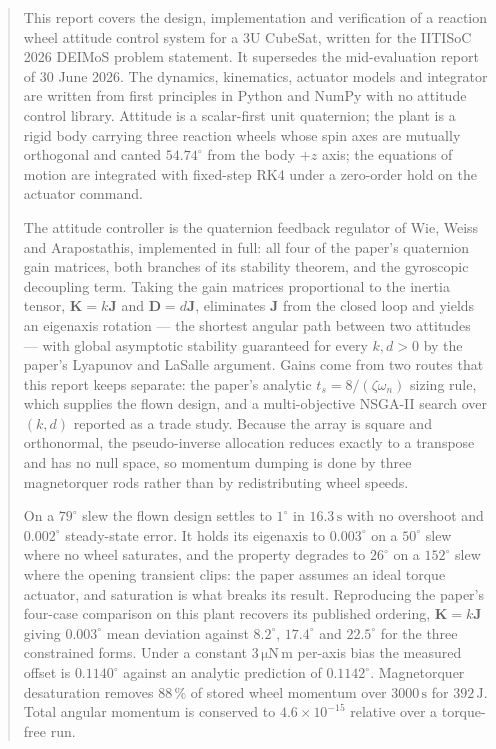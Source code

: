 \documentclass[conference,10pt,a4paper]{IEEEtran}
\newcommand{\mat}[1]{\bm{#1}}
\newcommand{\unit}[1]{\ensuremath{\,\mathrm{#1}}}
\begin{document}
\begin{abstract}
This report covers the design, implementation and verification of a reaction
wheel attitude control system for a 3U CubeSat, written for the IITISoC 2026
DEIMoS problem statement. It supersedes the mid-evaluation report of 30 June
2026. The dynamics, kinematics, actuator models and integrator are written
from first principles in Python and NumPy with no attitude control library.
Attitude is a scalar-first unit quaternion; the plant is a rigid body carrying
three reaction wheels whose spin axes are mutually orthogonal and canted
$54.74^\circ$ from the body $+z$ axis; the equations of motion are integrated
with fixed-step RK4 under a zero-order hold on the actuator command.

The attitude controller is the quaternion feedback regulator of Wie, Weiss and
Arapostathis, implemented in full: all four of the paper's quaternion gain
matrices, both branches of its stability theorem, and the gyroscopic decoupling
term. Taking the gain matrices proportional to the inertia tensor,
$\mat{K}=k\mat{J}$ and $\mat{D}=d\mat{J}$, eliminates $\mat{J}$ from the closed
loop and yields an eigenaxis rotation --- the shortest angular path between two
attitudes --- with global asymptotic stability guaranteed for every $k,d>0$ by
the paper's Lyapunov and LaSalle argument. Gains come from two routes that this
report keeps separate: the paper's analytic $t_s=8/(\zeta\omega_n)$ sizing rule,
which supplies the flown design, and a multi-objective NSGA-II search over
$(k,d)$ reported as a trade study. Because the array is square and orthonormal, the pseudo-inverse
allocation reduces exactly to a transpose and has no null space, so momentum
dumping is done by three magnetorquer rods rather than by redistributing
wheel speeds.

On a $79^\circ$ slew the flown design settles to $1^\circ$ in $16.3\unit{s}$
with no overshoot and $0.002^\circ$ steady-state error. It holds its eigenaxis
to $0.003^\circ$ on a $50^\circ$ slew where no wheel saturates, and the property
degrades to $26^\circ$ on a $152^\circ$ slew where the opening transient clips:
the paper assumes an ideal torque actuator, and saturation is what breaks its
result. Reproducing the paper's four-case comparison on this plant recovers its
published ordering, $\mat{K}=k\mat{J}$ giving $0.003^\circ$ mean deviation
against $8.2^\circ$, $17.4^\circ$ and $22.5^\circ$ for the three constrained
forms. Under a constant $3\unit{\mu N\,m}$ per-axis bias the measured offset is
$0.1140^\circ$ against an analytic prediction of $0.1142^\circ$. Magnetorquer desaturation removes $88\,\%$ of stored wheel
momentum over $3000\unit{s}$ for $392\unit{J}$. Total angular momentum is
conserved to $4.6\times10^{-15}$ relative over a torque-free run.
\end{abstract}
\end{document}
